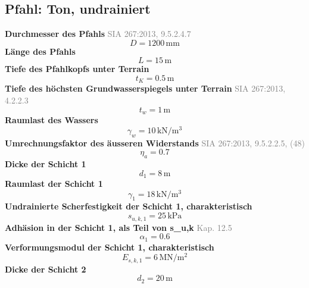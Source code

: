 \documentclass[11pt,a4paper]{article}
\newcommand{\normref}[1]{{\small\textcolor{gray}{#1}}}
\begin{document}
\subsection{Pfahl: Ton, undrainiert}
\noindent\textbf{Durchmesser des Pfahls} \hfill \normref{SIA 267:2013, 9.5.2.4.7}
\begin{equation*}
D = 1200\,\mathrm{mm}
\end{equation*}
\noindent\textbf{Länge des Pfahls}
\begin{equation*}
L = 15\,\mathrm{m}
\end{equation*}
\noindent\textbf{Tiefe des Pfahlkopfs unter Terrain}
\begin{equation*}
t_K = 0.5\,\mathrm{m}
\end{equation*}
\noindent\textbf{Tiefe des höchsten Grundwasserspiegels unter Terrain} \hfill \normref{SIA 267:2013, 4.2.2.3}
\begin{equation*}
t_w = 1\,\mathrm{m}
\end{equation*}
\noindent\textbf{Raumlast des Wassers}
\begin{equation*}
\gamma_w = 10\,\mathrm{kN}/\mathrm{m}^{3}
\end{equation*}
\noindent\textbf{Umrechnungsfaktor des äusseren Widerstands} \hfill \normref{SIA 267:2013, 9.5.2.2.5, (48)}
\begin{equation*}
\eta_a = 0.7
\end{equation*}
\noindent\textbf{Dicke der Schicht 1}
\begin{equation*}
d_{1} = 8\,\mathrm{m}
\end{equation*}
\noindent\textbf{Raumlast der Schicht 1}
\begin{equation*}
\gamma_{1} = 18\,\mathrm{kN}/\mathrm{m}^{3}
\end{equation*}
\noindent\textbf{Undrainierte Scherfestigkeit der Schicht 1, charakteristisch}
\begin{equation*}
s_{u,k,1} = 25\,\mathrm{kPa}
\end{equation*}
\noindent\textbf{Adhäsion in der Schicht 1, als Teil von s\_u,k} \hfill \normref{Kap. 12.5}
\begin{equation*}
\alpha_{1} = 0.6
\end{equation*}
\noindent\textbf{Verformungsmodul der Schicht 1, charakteristisch}
\begin{equation*}
E_{s,k,1} = 6\,\mathrm{MN}/\mathrm{m}^{2}
\end{equation*}
\noindent\textbf{Dicke der Schicht 2}
\begin{equation*}
d_{2} = 20\,\mathrm{m}
\end{equation*}
\end{document}
